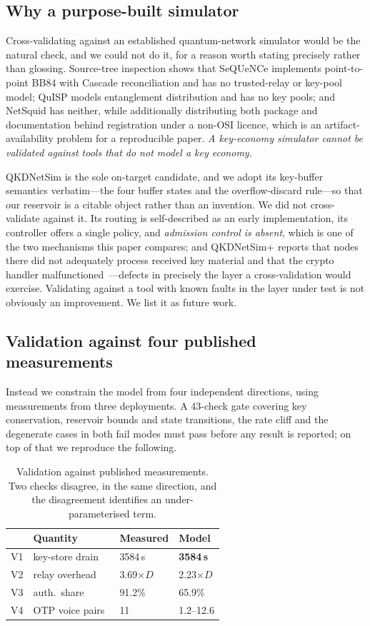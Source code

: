 \documentclass[conference]{IEEEtran}
\begin{document}
\subsection{Why a purpose-built simulator}
Cross-validating against an established quantum-network simulator would be the
natural check, and we could not do it, for a reason worth stating precisely
rather than glossing. Source-tree inspection shows that SeQUeNCe implements
point-to-point BB84 with Cascade reconciliation and has no trusted-relay or
key-pool model; QuISP models entanglement distribution and has no key pools; and
NetSquid has neither, while additionally distributing both package and
documentation behind registration under a non-OSI licence, which is an
artifact-availability problem for a reproducible paper. \emph{A key-economy
simulator cannot be validated against tools that do not model a key economy.}

QKDNetSim is the sole on-target candidate, and we adopt its key-buffer semantics
verbatim---the four buffer states and the overflow-discard rule---so that our
reservoir is a citable object rather than an invention. We did not cross-validate
against it. Its routing is self-described as an early implementation, its
controller offers a single policy, and \emph{admission control is absent}, which
is one of the two mechanisms this paper compares; and QKDNetSim+ reports that
nodes there did not adequately process received key material and that the crypto
handler malfunctioned~\cite{qkdnetsimplus}---defects in precisely the layer a
cross-validation would exercise. Validating against a tool with known faults in
the layer under test is not obviously an improvement. We list it as future work.

\subsection{Validation against four published measurements}\label{sec:valid}
Instead we constrain the model from four independent directions, using
measurements from three deployments. A 43-check gate covering key conservation,
reservoir bounds and state transitions, the rate cliff and the degenerate cases
in both fail modes must pass before any result is reported; on top of that we
reproduce the following.

\begin{table}[t]
\caption{Validation against published measurements. Two checks disagree, in the
same direction, and the disagreement identifies an under-parameterised term.}
\label{tab:valid}
\centering\footnotesize
\begin{tabular}{@{}llll@{}}
\toprule
& Quantity & Measured & Model\\
\midrule
V1 & key-store drain~\cite{peev} & 3584\,s & \textbf{3584\,s}\\
V2 & relay overhead~\cite{dynes} & 3.69$\times D$ & 2.23$\times D$\\
V3 & auth.\ share~\cite{peev} & 91.2\% & 65.9\%\\
V4 & OTP voice pairs~\cite{chen} & 11 & 1.2--12.6\\
\bottomrule
\end{tabular}
\end{table}
\end{document}
